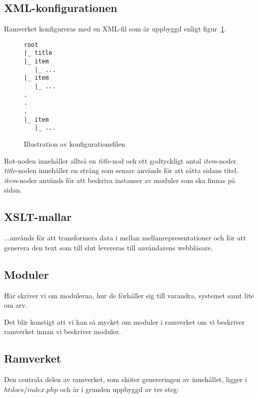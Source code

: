 \subsection{XML-konfigurationen}
Ramverket konfigureras med en XML-fil som är uppbyggd enligt
figur~\ref{fig:xml-config}.

\begin{figure}[h]
\begin{verbatim}
root
|_ title
|_ item
   |_ ...
|_ item
   |_ ...
.
.
.
|_ item
   |_ ...
\end{verbatim}
\caption{Illustration av konfigurationsfilen}
\label{fig:xml-config}
\end{figure}

Rot-noden innehåller alltså en {\it title}-nod och ett godtyckligt antal
{\it item}-noder. {\it title}-noden innehåller en sträng som senare används för
att sätta sidans titel. {\it item}-noder används för att beskriva instanser av
moduler som ska finnas på sidan.

\subsection{XSLT-mallar}
...används för att transformera data i mellan mellanrepresentationer och för att
generera den text som till slut levereras till användarens webbläsare.

\subsection{Moduler}
Här skriver vi om modulerna, hur de förhåller sig till varandra, systemet samt
lite om arv.

Det blir konstigt att vi kan så mycket om moduler i ramverket om vi
beskriver ramverket innan vi beskriver moduler.

\subsection{Ramverket}

Den centrala delen av ramverket, som sköter genereringen av innehållet, ligger
i $htdocs/index.php$ och är i grunden uppbyggd av tre steg:

